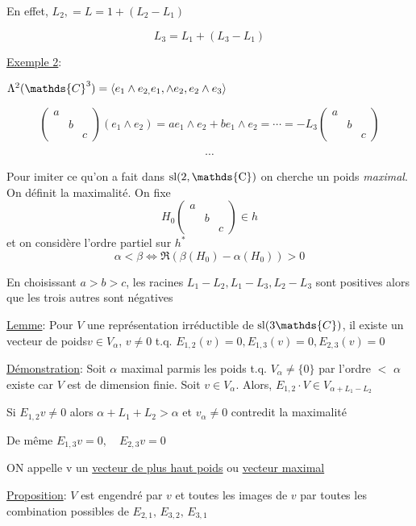 En effet, \(L_2 , = L=1 + \left( L_2 - L_1 \right) \)

\[ L_3 = L_1 + \left( L_3 - L_1  \right)  \]

\underline{Exemple 2}:

\(\Lambda^{2} (\mathds{C}^3) = \expval{e_1 \wedge e_{2,} e_1, \wedge e_2, e_2 \wedge e_3 }\)


\[ \begin{pmatrix} a\\ &b \\&&c  \end{pmatrix} \left( e_1 \wedge e_2  \right) = a e_1 \wedge e_2 +  b e_1 \wedge e_2 = \dotsb = -L_3 \begin{pmatrix} a \\& b\\&&c \end{pmatrix}  \]

\[ \dotsb \]


Pour imiter ce qu'on a fait dans \({\rm{}sl(2, \mathds{C})}\) on cherche un poids \textit{maximal}. On définit la maximalité. On fixe \[ H_0 \begin{pmatrix} a\\&b\\&&c \end{pmatrix} \in h  \] et on considère l'ordre partiel sur \(h^{*}\) \[ \alpha < \beta \iff \Re(\beta(H_0 ) - \alpha(H_0 )) > 0  \] 

En choisissant \(a > b > c\), les racines \(L_1 - L_2 , L_1 - L_3 , L_2 - L_3  \) sont positives alors que les trois autres sont négatives 

\underline{Lemme}: Pour \(V\) une représentation irréductible de \({\rm{}sl}(3 \mathds{C}) \), il existe un vecteur de poids\( v \in V_{\alpha} \), \(v\neq 0\) t.q. \(E_{1,2} (v) = 0, E_{1,3} (v) =0, E_{2,3} (v) =0 \)


\underline{Démonstration}: Soit \(\alpha\) maximal parmis les poids t.q. \(V_{\alpha} \neq \{ 0 \}  \) par l'ordre \(<\) \(\alpha\) existe car \(V\) est de dimension finie. Soit \(v \in V_{\alpha} \). Alors, \(E_{1,2} \cdot V \in V_{\alpha+L_1-L_2} \)

Si \(E_{1,2} v \neq 0 \) alors \(\alpha + L_1 +L_2 > \alpha\) et \(v_{\alpha} \neq 0\) contredit la maximalité

De même \( E_{1,3} v= 0, \quad E_{2,3} v = 0\)


ON appelle v un \underline{vecteur de plus haut poids}  ou \underline{vecteur maximal}  

\underline{Proposition}: \(V\) est engendré par \(v\) et toutes les images de \(v\) par toutes les combination possibles de \(E_{2,1} ,\, E_{3,2},\, E_{3,1} \) 


